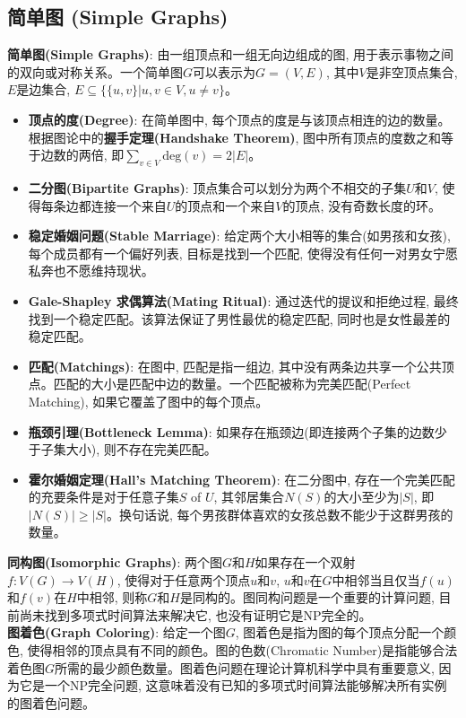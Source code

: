 \documentclass[12pt, a4paper, UTF8]{ctexart}
\newcommand{\term}[1]{\textbf{\textcolor{blue!80!black}{#1}}}
\begin{document}
\begin{sloppypar}
    \subsection{简单图 (Simple Graphs)}
    \term{简单图(Simple Graphs)}: 由一组顶点和一组无向边组成的图, 用于表示事物之间的双向或对称关系。一个简单图$G$可以表示为$G = (V, E)$, 其中$V$是非空顶点集合, $E$是边集合, $E \subseteq \{ \{u, v\} | u, v \in V, u \neq v \}$。
    \begin{itemize}[nosep]
        \item \term{顶点的度(Degree)}: 在简单图中, 每个顶点的度是与该顶点相连的边的数量。根据图论中的\term{握手定理(Handshake Theorem)}, 图中所有顶点的度数之和等于边数的两倍, 即$\sum\limits_{v \in V} \text{deg}(v) = 2|E|$。
        \item \term{二分图(Bipartite Graphs)}: 顶点集合可以划分为两个不相交的子集$U$和$V$, 使得每条边都连接一个来自$U$的顶点和一个来自$V$的顶点, 没有奇数长度的环。
        \item \term{稳定婚姻问题(Stable Marriage)}: 给定两个大小相等的集合(如男孩和女孩), 每个成员都有一个偏好列表, 目标是找到一个匹配, 使得没有任何一对男女宁愿私奔也不愿维持现状。
        \item \term{Gale-Shapley 求偶算法(Mating Ritual)}: 通过迭代的提议和拒绝过程, 最终找到一个稳定匹配。该算法保证了男性最优的稳定匹配, 同时也是女性最差的稳定匹配。
        \item \term{匹配(Matchings)}: 在图中, 匹配是指一组边, 其中没有两条边共享一个公共顶点。匹配的大小是匹配中边的数量。一个匹配被称为完美匹配(Perfect Matching), 如果它覆盖了图中的每个顶点。
        \item \term{瓶颈引理(Bottleneck Lemma)}: 如果存在瓶颈边(即连接两个子集的边数少于子集大小), 则不存在完美匹配。
        \item \term{霍尔婚姻定理(Hall's Matching Theorem)}: 在二分图中, 存在一个完美匹配的充要条件是对于任意子集$S$ of $U$, 其邻居集合$N(S)$的大小至少为$|S|$, 即$|N(S)| \geq |S|$。换句话说, 每个男孩群体喜欢的女孩总数不能少于这群男孩的数量。
    \end{itemize}
    \term{同构图(Isomorphic Graphs)}: 两个图$G$和$H$如果存在一个双射$f: V(G) \to V(H)$, 使得对于任意两个顶点$u$和$v$, $u$和$v$在$G$中相邻当且仅当$f(u)$和$f(v)$在$H$中相邻, 则称$G$和$H$是同构的。图同构问题是一个重要的计算问题, 目前尚未找到多项式时间算法来解决它, 也没有证明它是NP完全的。\\
    \term{图着色(Graph Coloring)}: 给定一个图$G$, 图着色是指为图的每个顶点分配一个颜色, 使得相邻的顶点具有不同的颜色。图的色数(Chromatic Number)是指能够合法着色图$G$所需的最少颜色数量。图着色问题在理论计算机科学中具有重要意义, 因为它是一个NP完全问题, 这意味着没有已知的多项式时间算法能够解决所有实例的图着色问题。\\

\end{sloppypar}
\end{document}
